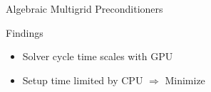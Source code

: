 \begin{frame}{Algebraic Multigrid Preconditioners}
  \begin{block}{Findings}
    \begin{itemize}
     \item Solver cycle time scales with GPU
     \item Setup time limited by CPU $\Rightarrow$ Minimize
    \end{itemize}
  \end{block}

\end{frame}


